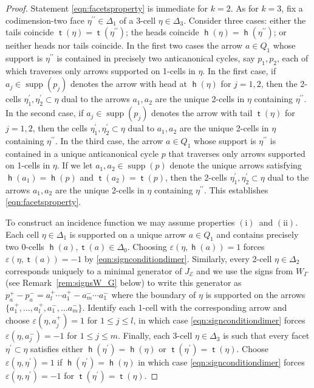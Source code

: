 \documentclass[11pt,a4paper]{amsart}
\numberwithin{equation}{section}
\theoremstyle{definition}
\theoremstyle{remark}
\newcommand{\one}{\ensuremath{(\mathrm{i})}}
\newcommand{\two}{\ensuremath{(\mathrm{ii})}}
\newcommand{\head}{\operatorname{\mathsf{h}}}
\newcommand{\supp}{\operatorname{supp}}
\newcommand{\tail}{\operatorname{\mathsf{t}}}
\begin{document}
\begin{proof}
Statement \eqref{eqn:facetsproperty} is immediate for $k=2$. As for $k=3$, fix a codimension-two face $\eta^{\prime\prime}\in \Delta_1$ of a 3-cell $\eta\in \Delta_3$. Consider three cases: either the tails coincide $\tail(\eta)=\tail(\eta^{\prime\prime})$; the heads coincide $\head(\eta)=\head(\eta^{\prime\prime})$; or neither heads nor tails coincide. In the first two cases the arrow $a\in Q_1$ whose support is $\eta^{\prime\prime}$ is contained in precisely two anticanonical cycles, say $p_1, p_2$, each of which traverses only arrows supported on 1-cells in $\eta$. In the first case, if $a_j\in \supp(p_j)$ denotes the arrow with head at $\head(\eta)$ for $j=1,2$, then the 2-cells $\eta_1^\prime, \eta_2^\prime\subset \eta$ dual to the arrows $a_1, a_2$ are the unique 2-cells in $\eta$ containing $\eta^{\prime\prime}$. In the second case, if $a_j\in \supp(p_j)$ denotes the arrow with tail $\tail(\eta)$ for $j=1,2$, then the cells $\eta_1^\prime, \eta_2^\prime\subset \eta$ dual to $a_1, a_2$ are the unique 2-cells in $\eta$ containing $\eta^{\prime\prime}$. In the third case,  the arrow $a\in Q_1$ whose support is $\eta^{\prime\prime}$ is contained in a unique anticanonical cycle $p$ that traverses only arrows supported on 1-cells in $\eta$. If we let $a_1, a_2\in \supp(p)$ denote the unique arrows satisfying $\head(a_1)=\head(p)$ and $\tail(a_2)=\tail(p)$, then the 2-cells $\eta_1^\prime, \eta_2^\prime\subset \eta$ dual to the arrows $a_1, a_2$ are the unique 2-cells in $\eta$ containing $\eta^{\prime\prime}$. This establishes \eqref{eqn:facetsproperty}.

To construct an incidence function we may assume properties \one\ and \two. Each cell $\eta\in \Delta_1$ is supported on a unique arrow $a\in Q_1$ and contains precisely two 0-cells $\head(a), \tail(a)\in \Delta_0$. Choosing $\varepsilon(\eta, \head(a)) = 1$ forces $\varepsilon(\eta, \tail(a)) = -1$ by \eqref{eqn:signconditiondimer}. Similarly, every 2-cell $\eta\in \Delta_2$ corresponds uniquely to a minimal generator of $J_\mathscr{E}$ and we use the signs from $W_\Gamma$ (see Remark~\ref{rem:signsW_G} below) to write this generator as $p_a^+-p_a^- = a_l^+\cdots a_1^+ - a_m^-\cdots a_1^-$ where the boundary of $\eta$ is supported on the arrows $\{a_1^+, \dots ,a_l^+, a_1^-, \dots a_m^-\}$. Identify each 1-cell with the corresponding arrow   and choose $\varepsilon(\eta,a_j^+)=1$ for $1\leq j\leq l$, in which case \eqref{eqn:signconditiondimer} forces $\varepsilon(\eta, a_j^-) = -1$ for $1\le j\leq m$. Finally, each 3-cell $\eta\in \Delta_3$ is such that every facet $\eta^\prime\subset \eta$ satisfies either $\head(\eta^\prime)=\head(\eta)$ or $\tail(\eta^\prime)=\tail(\eta)$. Choose $\varepsilon(\eta, \eta^\prime) = 1$ if $\head(\eta^\prime)=\head(\eta)$ in which case \eqref{eqn:signconditiondimer} forces $\varepsilon(\eta, \eta^\prime) = -1$ for $\tail(\eta^\prime)=\tail(\eta)$.


\end{proof}
\end{document}
